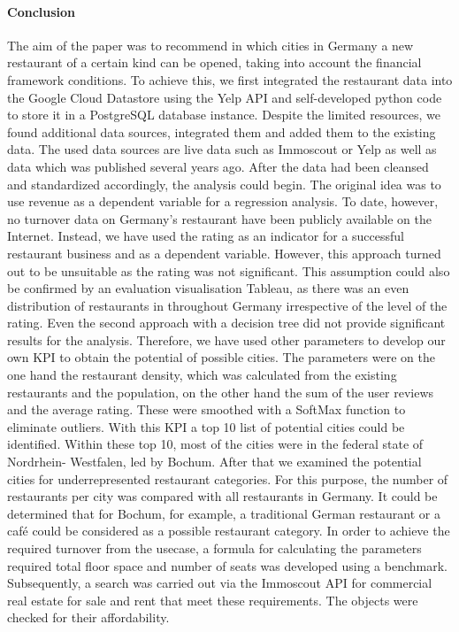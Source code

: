 \paragraph{Conclusion}
The aim of the paper was to recommend in which cities in Germany a new restaurant of a certain kind can be opened, taking into account the financial framework conditions. To achieve this, we first integrated the restaurant data into the Google Cloud Datastore using the Yelp API and self-developed python code to store it in a PostgreSQL database instance. Despite the limited resources, we found additional data sources, integrated them and added them to the existing data. The used data sources are live data such as Immoscout or Yelp as well as data which was published several years ago. After the data had been cleansed and standardized accordingly, the analysis could begin. The original idea was to use revenue as a dependent variable for a regression analysis. To date, however, no turnover data on Germany's restaurant have been publicly available on the Internet. Instead, we have used the rating as an indicator for a successful restaurant business and as a dependent variable. However, this approach turned out to be unsuitable as the rating was not significant. This assumption could also be confirmed by an evaluation visualisation Tableau, as there was an even distribution of restaurants in throughout Germany irrespective of the level of the rating. %
Even the second approach with a decision tree did not provide significant results for the analysis. Therefore, we have used other parameters to develop our own KPI to obtain the potential of possible cities. The parameters were on the one hand the restaurant density, which was calculated from the existing restaurants and the population, on the other hand the sum of the user reviews and the average rating. These were smoothed with a SoftMax function to eliminate outliers. With this KPI a top 10 list of potential cities could be identified. Within these top 10, most of the cities were in the federal state of Nordrhein- Westfalen, led by Bochum. After that we examined the potential cities for underrepresented restaurant categories. For this purpose, the number of restaurants per city was compared with all restaurants in Germany. It could be determined that for Bochum, for example, a traditional German restaurant or a café could be considered as a possible restaurant category.
In order to achieve the required turnover from the usecase, a formula for calculating the parameters required total floor space and number of seats was developed using a benchmark. Subsequently, a search was carried out via the Immoscout API for commercial real estate for sale and rent that meet these requirements. The objects were checked for their affordability. %

